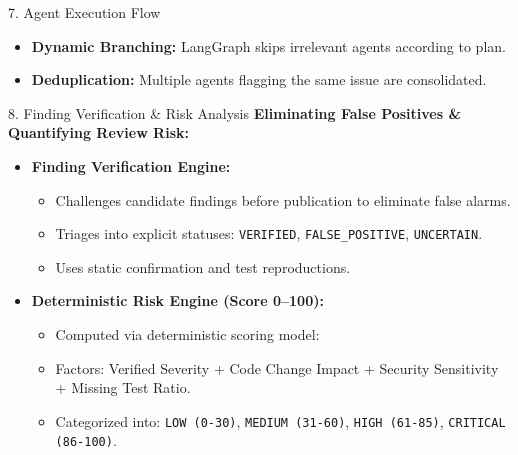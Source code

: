\documentclass[aspectratio=169,11pt]{beamer}
\begin{document}
\begin{frame}{7. Agent Execution Flow}
{
  }

  \vspace{0.35cm}
  \begin{itemize}
    \item \textbf{Dynamic Branching:} LangGraph skips irrelevant agents according to plan.
    \item \textbf{Deduplication:} Multiple agents flagging the same issue are consolidated.
  \end{itemize}
\end{frame}

\begin{frame}{8. Finding Verification \& Risk Analysis}
  \textbf{Eliminating False Positives \& Quantifying Review Risk:}
  \vspace{0.25cm}
  \begin{itemize}
    \item \textbf{Finding Verification Engine:}
      \begin{itemize}
        \item Challenges candidate findings before publication to eliminate false alarms.
        \item Triages into explicit statuses: \texttt{\small VERIFIED}, \texttt{\small FALSE\_POSITIVE}, \texttt{\small UNCERTAIN}.
        \item Uses static confirmation and test reproductions.
      \end{itemize}
    \vspace{0.25cm}
    \item \textbf{Deterministic Risk Engine (Score 0--100):}
      \begin{itemize}
        \item Computed via deterministic scoring model:
        \item Factors: Verified Severity + Code Change Impact + Security Sensitivity + Missing Test Ratio.
        \item Categorized into: \texttt{\small LOW (0-30)}, \texttt{\small MEDIUM (31-60)}, \texttt{\small HIGH (61-85)}, \texttt{\small CRITICAL (86-100)}.
      \end{itemize}
  \end{itemize}
\end{frame}
\end{document}
